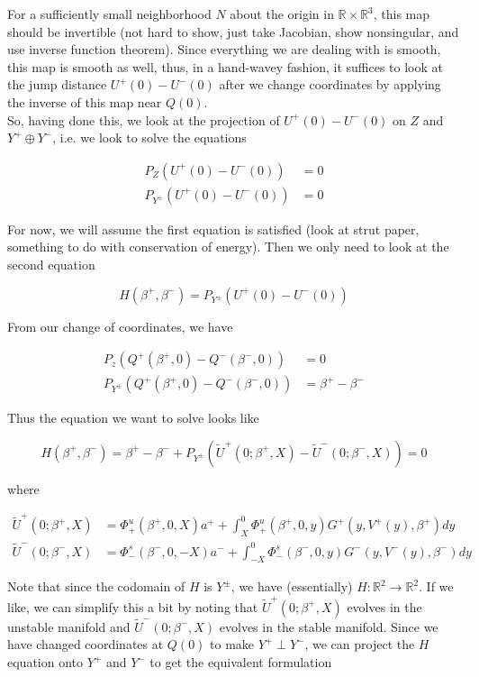 \documentclass[12pt]{article}
\def\R{{\mathbb R}}
\begin{document}
For a sufficiently small neighborhood $N$ about the origin in $\R \times \R^3$, this map should be invertible (not hard to show, just take Jacobian, show nonsingular, and use inverse function theorem). Since everything we are dealing with is smooth, this map is smooth as well, thus, in a hand-wavey fashion, it suffices to look at the jump distance $U^+(0) - U^-(0)$ after we change coordinates by applying the inverse of this map near $Q(0)$.
\\

So, having done this, we look at the projection of $U^+(0) - U^-(0)$ on $Z$ and $Y^+ \oplus Y^-$, i.e. we look to solve the equations

\begin{align*}
P_Z(U^+(0) - U^-(0)) &= 0 \\
P_{Y^\pm}(U^+(0) - U^-(0)) &= 0
\end{align*}

For now, we will assume the first equation is satisfied (look at strut paper, something to do with conservation of energy). Then we only need to look at the second equation

\begin{equation}
H(\beta^+, \beta^-) = P_{Y^\pm}(U^+(0) - U^-(0))
\end{equation}

From our change of coordinates, we have

\begin{align*}
P_z(Q^+(\beta^+, 0) - Q^-(\beta^-, 0)) &= 0 \\
P_{Y^\pm}(Q^+(\beta^+, 0) - Q^-(\beta^-, 0)) &= \beta^+ - \beta^-
\end{align*}

Thus the equation we want to solve looks like

\begin{equation}
H(\beta^+, \beta^-) = 
\beta^+ - \beta^- + P_{Y^\pm}(\tilde{U}^+(0; \beta^+, X) - \tilde{U}^-(0; \beta^-, X)) = 0
\end{equation}

where

\begin{align*}
\tilde{U}^+(0; \beta^+, X) &= \Phi^u_+(\beta^+, 0, X) a^+ + \int_{X}^0 \Phi_+^u(\beta^+, 0, y) G^+(y, V^+(y),\beta^+) dy \\ 
\tilde{U}^-(0; \beta^-, X) &= \Phi^s_-(\beta^-, 0, -X) a^- + \int_{-X}^0 \Phi_-^s(\beta^-, 0, y) G^-(y, V^-(y),\beta^-) dy 
\end{align*}

Note that since the codomain of $H$ is $Y^\pm$, we have (essentially) $H:\R^2 \rightarrow \R^2$. If we like, we can simplify this a bit by noting that $\tilde{U}^+(0; \beta^+, X)$ evolves in the unstable manifold and $\tilde{U}^-(0; \beta^-, X)$ evolves in the stable manifold. Since we have changed coordinates at $Q(0)$ to make $Y^+ \perp Y^-$, we can project the $H$ equation onto $Y^+$ and $Y^-$ to get the equivalent formulation
\end{document}
